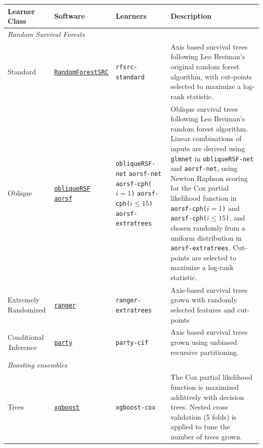 \documentclass[twoside,11pt]{article}\usepackage[]{graphicx}\usepackage[]{color}
\begin{document}
\begin{landscape}

\begin{table}[h!]
\centering
\begin{tabular}{p{2cm} | p{3cm} p{4cm} p{12cm}}
 \hline
 Learner Class & Software & Learners & Description \\ [0.5ex]
 \hline\hline
 \multicolumn{3}{l}{\textit{Random Survival Forests}}\\
 \hline\hline
 Standard & \href{https://www.randomforestsrc.org/index.html}{\texttt{RandomForestSRC}} & \texttt{rfsrc-standard} & Axis based survival trees following Leo Breiman's original random forest algorithm, with cut-points selected to maximize a log-rank statistic.  \\ \hline
 Oblique & \href{https://CRAN.R-project.org/package=obliqueRSF}{\texttt{obliqueRSF}} \newline \href{https://bcjaeger.github.io/aorsf/}{\texttt{aorsf}} &
 \texttt{obliqueRSF-net} \newline
 \texttt{aorsf-net} \newline
 \texttt{aorsf-cph($i=1$)} \newline
 \texttt{aorsf-cph($i \leq 15$)} \newline
 \texttt{aorsf-extratrees} &
 Oblique survival trees following Leo Breiman's random forest algorithm. Linear combinations of inputs are derived using \texttt{glmnet} in \texttt{obliqueRSF-net} and \texttt{aorsf-net}, using Newton Raphson scoring for the Cox partial likelihood function in \texttt{aorsf-cph($i=1$)} and \texttt{aorsf-cph($i \leq 15$)}, and chosen randomly from a uniform distribution in \texttt{aorsf-extratrees}. Cut-points are selected to maximize a log-rank statistic. \\ \hline
 Extremely \,Randomized & \href{https://CRAN.R-project.org/package=ranger}{\texttt{ranger}} & \texttt{ranger-extratrees} & Axis-based survival trees grown with randomly selected features and cut-points\\ \hline
 Conditional \,Inference & \href{http://party.r-forge.r-project.org/}{\texttt{party}} & \texttt{party-cif} & Axis based survival trees grown using unbiased recursive partitioning.  \\
 \hline\hline
 \multicolumn{3}{l}{\textit{Boosting ensembles}}\\
 \hline\hline
 Trees & \href{https://xgboost.readthedocs.io/en/stable/#}{\texttt{xgboost}} & \texttt{xgboost-cox} &  The Cox partial likelihood function is maximized additively with decision trees. Nested cross validation (5 folds) is applied to tune the number of trees grown.  \\

\end{tabular}
\end{table}
\end{landscape}
\end{document}
